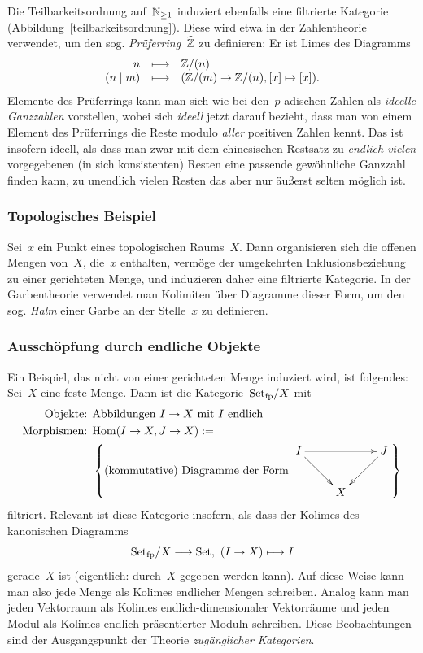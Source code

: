 Die Teilbarkeitsordnung auf~$\mathbb{N}_{\geq 1}$ induziert ebenfalls eine
filtrierte Kategorie (Abbildung~\ref{teilbarkeitsordnung}). Diese wird etwa
in der Zahlentheorie verwendet, um den sog. \emph{Prüferring}~$\widehat{\mathbb{Z}}$ zu
definieren: Er ist Limes des Diagramms
\[ \begin{array}{@{}rcl@{}}
  n &\longmapsto& \ZZ/(n) \\
  (n \mid m) &\longmapsto& (\ZZ/(m) \to \ZZ/(n), [x] \mapsto [x]).
\end{array} \]
Elemente des Prüferrings kann man sich wie bei den~$p$-adischen Zahlen als
\emph{ideelle Ganzzahlen} vorstellen, wobei sich \emph{ideell} jetzt darauf
bezieht, dass man von einem Element des Prüferrings die Reste modulo
\emph{aller} positiven Zahlen kennt. Das ist insofern ideell, als dass man zwar
mit dem chinesischen Restsatz zu \emph{endlich vielen} vorgegebenen (in sich
konsistenten) Resten eine passende gewöhnliche Ganzzahl finden kann, zu
unendlich vielen Resten das aber nur äußerst selten möglich ist.


\subsubsection*{Topologisches Beispiel}

Sei~$x$ ein Punkt eines topologischen Raums~$X$. Dann organisieren sich
die offenen Mengen von~$X$, die~$x$ enthalten, vermöge der umgekehrten
Inklusionsbeziehung zu einer gerichteten Menge, und induzieren daher eine
filtrierte Kategorie. In der Garbentheorie verwendet man Kolimiten über
Diagramme dieser Form, um den sog. \emph{Halm} einer Garbe an der Stelle~$x$ zu
definieren.


\subsubsection*{Ausschöpfung durch endliche Objekte}

Ein Beispiel, das nicht von einer gerichteten Menge induziert wird, ist
folgendes: Sei~$X$ eine feste Menge. Dann ist die Kategorie~$\mathrm{Set}_\mathrm{fp}/X$ mit
\begin{align*}
  \text{Objekte: } & \text{Abbildungen $I \to X$ mit $I$ endlich} \\
  \text{Morphismen: } &
    \Hom(I \to X, J \to X) := \\ & \left\{
    \text{(kommutative) Diagramme der Form $\vcenter{\xymatrix{
       I \ar[rr] \ar[dr] & & J \ar[ld] \\
       & X
      }}$} \right\}
\end{align*}
filtriert. Relevant ist diese Kategorie insofern, als dass der Kolimes des
kanonischen Diagramms
\[ \mathrm{Set}_\mathrm{fp}/X \longrightarrow \mathrm{Set},\ (I \to X) \longmapsto I \]
gerade~$X$ ist (eigentlich: durch~$X$ gegeben werden kann). Auf diese Weise
kann man also jede Menge als Kolimes endlicher Mengen schreiben.
Analog kann man jeden Vektorraum als Kolimes endlich-dimensionaler Vektorräume
und jeden Modul als Kolimes endlich-präsentierter Moduln schreiben. Diese
Beobachtungen sind der Ausgangspunkt der Theorie \emph{zugänglicher Kategorien}.

